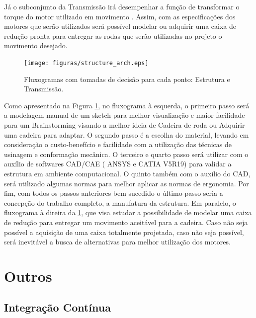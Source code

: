 Já o subconjunto da Transmissão irá desempenhar a função de 
transformar o torque do motor utilizado em movimento \cite{cardoso}. 
Assim, com as especificações dos motores que serão utilizados 
será possível modelar ou adquirir uma caixa de redução pronta para 
entregar as rodas que serão utilizadas no projeto o movimento desejado.

\begin{figure}[H]
  \centering
    \texttt{[image: figuras/structure\_arch.eps]}
  \caption{Fluxogramas com tomadas de decisão para cada ponto: Estrutura e Transmissão.}
  \label{fig:structure_arch}
\end{figure}

Como apresentado na Figura \ref{fig:structure_arch}, no fluxograma à esquerda, o primeiro passo 
será a modelagem manual de um sketch para melhor visualização 
e maior facilidade para um Brainstorming visando a melhor ideia 
de Cadeira de roda ou Adquirir uma cadeira para adaptar. 
O segundo passo é a escolha do material, levando em consideração 
o custo-benefício e facilidade com a utilização das técnicas de 
usinagem e conformação mecânica. O terceiro e quarto passo será 
utilizar com o auxílio de softwares CAD/CAE ( ANSYS e CATIA V5R19) 
para validar a estrutura em ambiente computacional. O quinto também 
com o auxílio do CAD, será utilizado algumas normas para melhor 
aplicar as normas de ergonomia. Por fim, com todos os passos anteriores bem sucedido o último passo seria a concepção do 
trabalho completo, a manufatura da estrutura. Em paralelo, o fluxograma à direira da \ref{fig:structure_arch}, 
que visa estudar a possibilidade de modelar uma caixa de redução 
para entregar um movimento aceitável para a cadeira. Caso não seja 
possível a 
aquisição de uma caixa totalmente projetada, caso não seja possível, 
será inevitável a busca de alternativas para melhor utilização dos motores.

\section{Outros}

\subsection{Integração Contínua}
